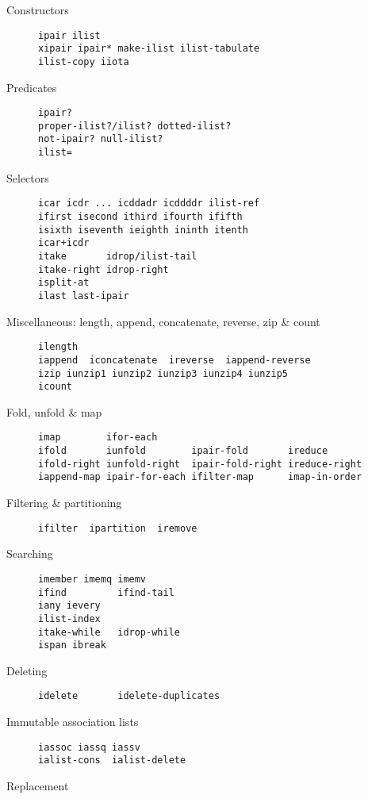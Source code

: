 \begin{description}
\item[ Constructors ]
\begin{verbatim}
ipair ilist
xipair ipair* make-ilist ilist-tabulate  
ilist-copy iiota
\end{verbatim}
\item[ Predicates ]
\begin{verbatim}
ipair?
proper-ilist?/ilist? dotted-ilist? 
not-ipair? null-ilist?
ilist=
\end{verbatim}
\item[ Selectors ]
\begin{verbatim}
icar icdr ... icddadr icddddr ilist-ref
ifirst isecond ithird ifourth ififth 
isixth iseventh ieighth ininth itenth
icar+icdr
itake       idrop/ilist-tail
itake-right idrop-right
isplit-at   
ilast last-ipair
\end{verbatim}
\item[ Miscellaneous: length, append, concatenate, reverse, zip \& count
]
\begin{verbatim}
ilength 
iappend  iconcatenate  ireverse  iappend-reverse
izip iunzip1 iunzip2 iunzip3 iunzip4 iunzip5
icount
\end{verbatim}
\item[ Fold, unfold \& map ]
\begin{verbatim}
imap        ifor-each
ifold       iunfold        ipair-fold       ireduce 
ifold-right iunfold-right  ipair-fold-right ireduce-right 
iappend-map ipair-for-each ifilter-map      imap-in-order
\end{verbatim}
\item[ Filtering \& partitioning ]
\begin{verbatim}
ifilter  ipartition  iremove
\end{verbatim}
\item[ Searching ]
\begin{verbatim}
imember imemq imemv
ifind         ifind-tail 
iany ievery
ilist-index
itake-while   idrop-while
ispan ibreak
\end{verbatim}
\item[ Deleting ]
\begin{verbatim}
idelete       idelete-duplicates 
\end{verbatim}
\item[ Immutable association lists ]
\begin{verbatim}
iassoc iassq iassv
ialist-cons  ialist-delete
\end{verbatim}
\item[ Replacement ]

\end{description}
